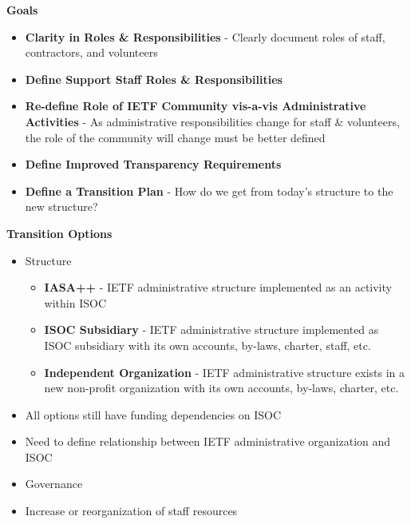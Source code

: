 \documentclass[helvetica,a4paper,landscape]{seminar}
\newcommand{\heading}[1]{%
  \begin{center} 
    \large\bf 
    #1 
  \end{center} 
  \vspace{.4 in}}
\begin{document}
\begin{slide}

\heading{Goals}

{\footnotesize
\begin{itemize}
\item \textbf{Clarity in Roles \& Responsibilities} - Clearly document roles of staff, contractors, and volunteers
\item \textbf{Define Support Staff Roles \& Responsibilities}
\item \textbf{Re-define Role of IETF Community vis-a-vis Administrative Activities} - As administrative responsibilities change for staff \& volunteers, the role of the community will change must be better defined
\item \textbf{Define Improved Transparency Requirements}
\item \textbf{Define a Transition Plan} - How do we get from today's structure to the new structure?
\end{itemize}
}

\end{slide}

\begin{slide}

\heading{Transition Options}

{\footnotesize
\begin{itemize}
\item{Structure}
   \begin{itemize}
      \item \textbf{IASA++} - IETF administrative structure implemented as an activity within ISOC
      \item \textbf{ISOC Subsidiary} - IETF administrative structure implemented as ISOC subsidiary with its own accounts, by-laws, charter, staff, etc.
      \item \textbf{Independent Organization} - IETF administrative structure exists in a new non-profit organization with its own accounts, by-laws, charter, etc.
   \end{itemize}
\item All options still have funding dependencies on ISOC
\item Need to define relationship between IETF administrative organization and ISOC
\item Governance
\item Increase or reorganization of staff resources
\end{itemize}
}

\end{slide}
\end{document}
